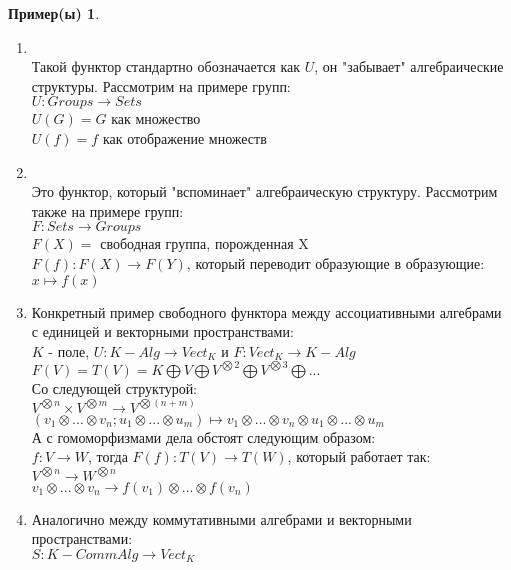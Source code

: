 \documentclass[a4paper]{article}
\theoremstyle{indented}
\theoremstyle{definition}
\newtheorem{exl}{Пример(ы)}
\theoremstyle{remark}
\DeclareMathOperator{\ra}{\rightarrow}
\begin{document}
\begin{exl} \ 
    \begin{enumerate}
        \item {} \\
        Такой функтор стандартно обозначается как $U$, он "забывает" алгебраические структуры. Рассмотрим на примере групп: \\
        $U: Groups \ra Sets$ \\
        $U(G) = G$ как множество \\
        $U(f) = f$ как отображение множеств
        \item {} \\
        Это функтор, который "вспоминает" алгебраическую структуру. Рассмотрим также на примере групп: \\
        $F: Sets \ra Groups$ \\
        $F(X) = $ свободная группа, порожденная X\\
        $F(f): F(X) \ra F(Y)$, который переводит образующие в образующие: $x \mapsto f(x)$
        \item Конкретный пример свободного функтора между ассоциативными алгебрами с единицей и векторными пространствами: \\
        $K$ - поле, $U: K-Alg \ra Vect_K$ и $F: Vect_K \ra K-Alg$ \\
        $F(V) = T(V) = K \bigoplus V \bigoplus V^{\bigotimes 2} \bigoplus V^{\bigotimes 3} \bigoplus ...$ \\
        Со следующей структурой: \\
        $V^{\bigotimes n} \times V ^{\bigotimes m} \ra V^{\bigotimes (n + m)}$ \\
        $(v_1 \otimes ... \otimes v_n; u_1 \otimes ... \otimes u_m) \mapsto v_1 \otimes ... \otimes v_n \otimes u_1 \otimes ... \otimes u_m$ \\
        А с гомоморфизмами дела обстоят следующим образом: \\
        $f: V \ra W$, тогда $F(f): T(V) \ra T(W)$, который работает так: \\
        $V^{\bigotimes n} \ra W^{\bigotimes n}$ \\
        $v_1 \otimes ... \otimes v_n \ra f(v_1) \otimes ... \otimes f(v_n)$
        \item Аналогично между коммутативными алгебрами и векторными пространствами: \\
        $S: K-CommAlg \ra Vect_K$ \\

\end{enumerate}
\end{exl}
\end{document}
